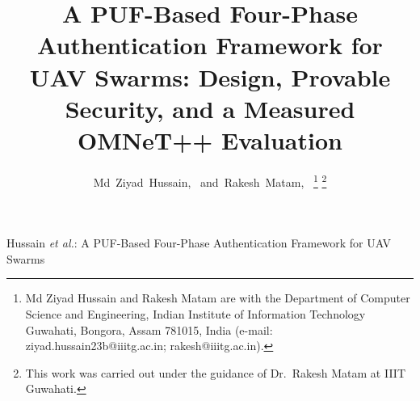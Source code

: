 \documentclass[journal]{IEEEtran}
\begin{document}
\title{A PUF-Based Four-Phase Authentication Framework for UAV Swarms: Design,
Provable Security, and a Measured OMNeT++ Evaluation}

\author{Md~Ziyad~Hussain,~
        and~Rakesh~Matam,~%
\thanks{Md Ziyad Hussain and Rakesh Matam are with the Department of Computer
Science and Engineering, Indian Institute of Information Technology Guwahati,
Bongora, Assam 781015, India (e-mail: ziyad.hussain23b@iiitg.ac.in;
rakesh@iiitg.ac.in).}%
\thanks{This work was carried out under the guidance of Dr.\ Rakesh Matam at
IIIT Guwahati.}}

%
{Hussain \MakeLowercase{\textit{et al.}}: A PUF-Based Four-Phase Authentication Framework for UAV Swarms}

\maketitle
\end{document}
